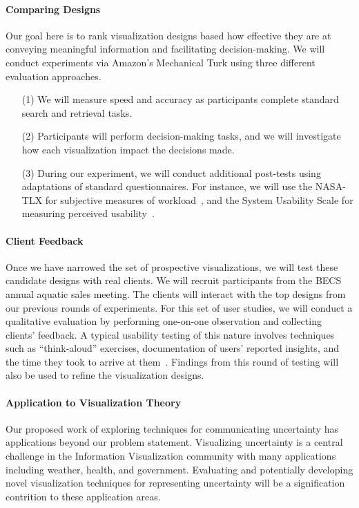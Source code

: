 \paragraph{Comparing Designs} 
Our goal here is to rank visualization designs based how effective they are at conveying meaningful information and facilitating decision-making.  
We will conduct experiments via Amazon's Mechanical Turk using three different evaluation approaches.
\begin{itemize}
\item[(1)] We will measure speed and accuracy as participants complete standard search and retrieval tasks.
\item[(2)] Participants will perform decision-making tasks, and we will investigate how each visualization impact the decisions made.
\item[(3)] During our experiment, we will conduct additional post-tests using adaptations of standard questionnaires. For instance, we will use the NASA-TLX for subjective measures of workload~\cite{hart1988development}, and the System Usability Scale for measuring perceived usability~\cite{bangor2008empirical}. 
\end{itemize}

\paragraph{Client Feedback}
Once we have narrowed the set of prospective visualizations, we will test these candidate designs with real clients. 
We will recruit participants from the BECS annual aquatic sales meeting.   
The clients will interact with the top designs from our previous rounds of experiments. 
For this set of user studies, we will conduct a qualitative evaluation by performing one-on-one observation and collecting clients' feedback.
A typical usability testing of this nature involves techniques such as “think-aloud” exercises, documentation of users’ reported insights, and the time they took to arrive at them~\cite{charlton2001handbook,hix1993developing,lewis1982using}. Findings from this round of testing will also be used to refine the visualization designs.

\paragraph{Application to Visualization Theory} 
Our proposed work of exploring techniques for communicating uncertainty has applications beyond our problem statement. Visualizing uncertainty is a central challenge in the Information Visualization community with many applications including weather, health, and government. Evaluating and potentially developing novel visualization techniques for representing uncertainty will be a signification contrition to these application areas.  


